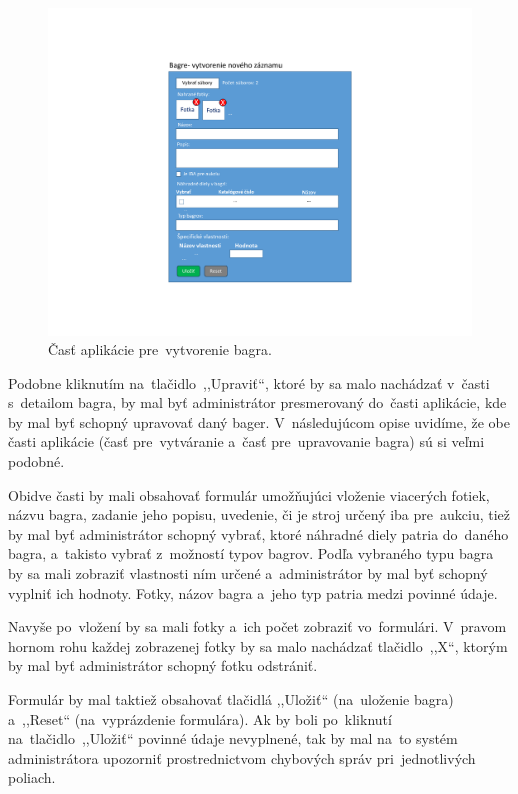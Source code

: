 \begin{figure}[H]\centering
\includegraphics[width=140mm]{../img/UI concept/excavator form}
\caption{Časť aplikácie pre~vytvorenie bagra.}
\label{excavator form}
\end{figure}

Podobne kliknutím na~tlačidlo~,,Upraviť``, ktoré by sa malo nachádzať v~časti s~detailom bagra, by mal byť administrátor presmerovaný do~časti aplikácie, kde by mal byť schopný upravovať daný bager. V~následujúcom opise uvidíme, že obe časti aplikácie (časť pre~vytváranie a~časť pre~upravovanie bagra) sú si veľmi podobné.

Obidve časti by mali obsahovať formulár umožňujúci vloženie viacerých fotiek, názvu bagra, zadanie jeho popisu, uvedenie, či je stroj určený iba pre~aukciu, tiež by mal byť administrátor schopný vybrať, ktoré náhradné diely patria do~daného bagra, a~takisto vybrať z~možností typov bagrov. Podľa vybraného typu bagra by sa mali zobraziť vlastnosti ním určené a~administrátor by mal byť schopný vyplniť ich hodnoty. Fotky, názov bagra a~jeho typ patria medzi povinné údaje.

Navyše po~vložení by sa mali fotky a~ich počet zobraziť vo~formulári. V~pravom hornom rohu každej zobrazenej fotky by sa malo nachádzať tlačidlo~,,X``, ktorým by mal byť administrátor schopný fotku odstrániť.

Formulár by mal taktiež obsahovať tlačidlá ,,Uložiť`` (na~uloženie bagra) a~,,Reset`` (na~vyprázdenie formulára). Ak by boli po~kliknutí na~tlačidlo~,,Uložiť`` povinné údaje nevyplnené, tak by mal na~to systém administrátora upozorniť prostrednictvom chybových správ pri~jednotlivých poliach.

